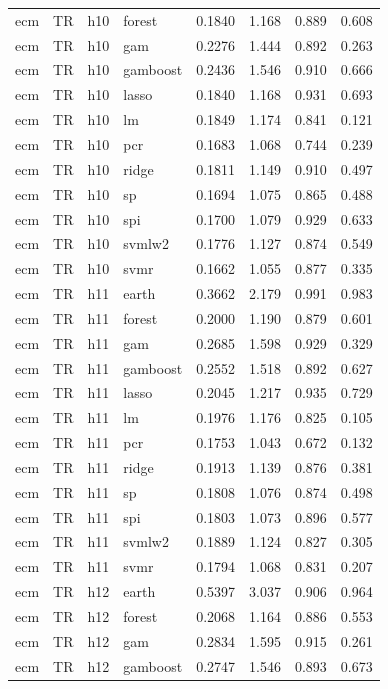 \begin{ThreePartTable}
\begin{longtable}[t]{llclcccc}
ecm & TR & h10 & forest & 0.1840 & 1.168 & 0.889 & 0.608\\
ecm & TR & h10 & gam & 0.2276 & 1.444 & 0.892 & 0.263\\
ecm & TR & h10 & gamboost & 0.2436 & 1.546 & 0.910 & 0.666\\
ecm & TR & h10 & lasso & 0.1840 & 1.168 & 0.931 & 0.693\\
ecm & TR & h10 & lm & 0.1849 & 1.174 & 0.841 & 0.121\\
ecm & TR & h10 & pcr & 0.1683 & 1.068 & 0.744 & 0.239\\
ecm & TR & h10 & ridge & 0.1811 & 1.149 & 0.910 & 0.497\\
ecm & TR & h10 & sp & 0.1694 & 1.075 & 0.865 & 0.488\\
ecm & TR & h10 & spi & 0.1700 & 1.079 & 0.929 & 0.633\\
ecm & TR & h10 & svmlw2 & 0.1776 & 1.127 & 0.874 & 0.549\\
ecm & TR & h10 & svmr & 0.1662 & 1.055 & 0.877 & 0.335\\
\addlinespace
ecm & TR & h11 & earth & 0.3662 & 2.179 & 0.991 & 0.983\\
ecm & TR & h11 & forest & 0.2000 & 1.190 & 0.879 & 0.601\\
ecm & TR & h11 & gam & 0.2685 & 1.598 & 0.929 & 0.329\\
ecm & TR & h11 & gamboost & 0.2552 & 1.518 & 0.892 & 0.627\\
ecm & TR & h11 & lasso & 0.2045 & 1.217 & 0.935 & 0.729\\
ecm & TR & h11 & lm & 0.1976 & 1.176 & 0.825 & 0.105\\
ecm & TR & h11 & pcr & 0.1753 & 1.043 & 0.672 & 0.132\\
ecm & TR & h11 & ridge & 0.1913 & 1.139 & 0.876 & 0.381\\
ecm & TR & h11 & sp & 0.1808 & 1.076 & 0.874 & 0.498\\
ecm & TR & h11 & spi & 0.1803 & 1.073 & 0.896 & 0.577\\
ecm & TR & h11 & svmlw2 & 0.1889 & 1.124 & 0.827 & 0.305\\
ecm & TR & h11 & svmr & 0.1794 & 1.068 & 0.831 & 0.207\\
\addlinespace
ecm & TR & h12 & earth & 0.5397 & 3.037 & 0.906 & 0.964\\
ecm & TR & h12 & forest & 0.2068 & 1.164 & 0.886 & 0.553\\
ecm & TR & h12 & gam & 0.2834 & 1.595 & 0.915 & 0.261\\
ecm & TR & h12 & gamboost & 0.2747 & 1.546 & 0.893 & 0.673\\

\end{longtable}
\end{ThreePartTable}
